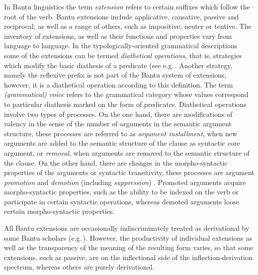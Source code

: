 In Bantu linguistics the term \emph{extension} refers to certain suffixes which follow the root of the verb. 
Bantu extensions include applicative, causative, passive and reciprocal, as well as a range of others, such as impositive, neuter or tentive.
The inventory of extensions, as well as their functions and properties vary from language to language. 
In the typologically-oriented grammatical descriptions some of the extensions can be termed \emph{diathetical operations}, that is, strategies which modify the basic diathesis of a predicate (see e.g.\,\citet[4]{Zunigaetal2019Grammatical}. 
Another strategy, namely the reflexive prefix is not part of the Bantu system of extensions, however, it is a diathetical operation according to this definition. 
The term \emph{(grammatical) voice} refers to the grammatical category whose values correspond to particular diathesis marked on the form of predicates. 
Diathetical operations involve two types of processes. 
On the one hand, there are modifications of valency in the sense of the number of arguments in the semantic argument structure, these processes are referred to as \emph{argument installment}, when new arguments are added  to the semantic structure of the clause as syntactic core argument, or \emph{removal}, when arguments are removed to the semantic structure of the clause. 
On the other hand, there are changes in the morpho-syntactic properties of the arguments or syntactic transitivity, these processes are argument \emph{promotion} and \emph{demotion} (including \emph{suppression}) \citep[4]{Zunigaetal2019Grammatical}. Promoted arguments acquire morpho-syntactic properties, such as the ability to be indexed on the verb or participate in certain syntactic operations, whereas demoted arguments loose certain morpho-syntactic properties. 

All Bantu extensions are occasionally indiscriminately treated as de\-ri\-vational by some Bantu scholars (e.g.\,\citealt{Schadebergetal2019Bantu}). 
However, the productivity of individual extensions as well as the transparency of the meaning of the resulting form varies, so that some extensions, such as passive, are on the inflectional side of the inflection-derivation spectrum, whereas others are purely derivational. 

